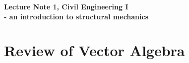 \documentclass[10pt,a4j]{article}
\newlength{\minitwocolumn}
\begin{document}
\newcommand{\fat}[1]{\mbox{\boldmath $#1$}}
\newcommand{\D}{\partial}
\newcommand{\w}{\omega}
\newcommand{\ga}{\alpha}
\newcommand{\gb}{\beta}
\newcommand{\gx}{\xi}
\newcommand{\gz}{\zeta}
\newcommand{\vhat}[1]{\hat{\fat{#1}}}
\newcommand{\spc}{\vspace{0.7\baselineskip}}
\newcommand{\halfspc}{\vspace{0.3\baselineskip}}

\newcommand{\twofig}[2]
 {
   \begin{figure}
     \begin{minipage}[t]{\minitwocolumn}
         \begin{center}   #1
         \end{center}
     \end{minipage}
         \hspace{\columnsep}
     \begin{minipage}[t]{\minitwocolumn}
         \begin{center} #2
         \end{center}
     \end{minipage}
   \end{figure}
 }
\begin{center}
	{\Large \bf Lecture Note 1, Civil Engineering I \\ - an introduction to structural mechanics}  
\end{center}
\section{Review of Vector Algebra}
\end{document}
